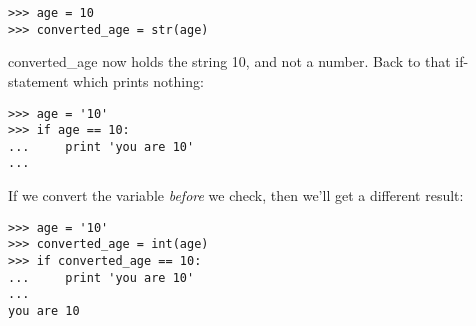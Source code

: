 \begin{listing}
\begin{verbatim}
>>> age = 10
>>> converted_age = str(age)
\end{verbatim}
\end{listing}

\noindent
converted\_age now holds the string 10, and not a number. Back to that if-statement which prints nothing:

\begin{listing}
\begin{verbatim}
>>> age = '10'
>>> if age == 10:
...     print 'you are 10'
...
\end{verbatim}
\end{listing}

\noindent
If we convert the variable \emph{before} we check, then we'll get a different result:

\begin{listing}
\begin{verbatim}
>>> age = '10'
>>> converted_age = int(age)
>>> if converted_age == 10:
...     print 'you are 10'
...
you are 10
\end{verbatim}
\end{listing}

\newpage
